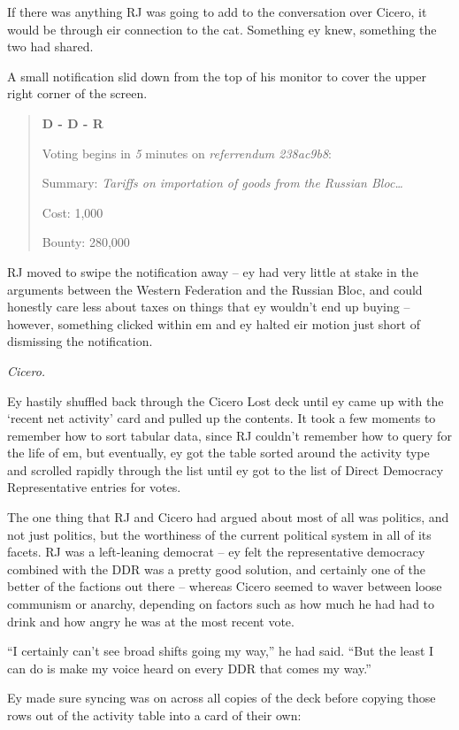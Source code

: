 If there was anything RJ was going to add to the conversation over Cicero, it would be through eir connection to the cat. Something ey knew, something the two had shared.

A small notification slid down from the top of his monitor to cover the upper right corner of the screen.

\begin{quotation}
  \textbf{D - D - R}

  Voting begins in \textit{5} minutes on \textit{referrendum 238ac9b8}:

  Summary: \textit{Tariffs on importation of goods from the Russian Bloc\ldots}

  Cost: 1,000

  Bounty: 280,000
\end{quotation}

RJ moved to swipe the notification away -- ey had very little at stake in the arguments between the Western Federation and the Russian Bloc, and could honestly care less about taxes on things that ey wouldn't end up buying -- however, something clicked within em and ey halted eir motion just short of dismissing the notification.

\textit{Cicero.}

Ey hastily shuffled back through the Cicero Lost deck until ey came up with the `recent net activity' card and pulled up the contents. It took a few moments to remember how to sort tabular data, since RJ couldn't remember how to query for the life of em, but eventually, ey got the table sorted around the activity type and scrolled rapidly through the list until ey got to the list of Direct Democracy Representative entries for votes.

The one thing that RJ and Cicero had argued about most of all was politics, and not just politics, but the worthiness of the current political system in all of its facets. RJ was a left-leaning democrat -- ey felt the representative democracy combined with the DDR was a pretty good solution, and certainly one of the better of the factions out there -- whereas Cicero seemed to waver between loose communism or anarchy, depending on factors such as how much he had had to drink and how angry he was at the most recent vote.

``I certainly can't see broad shifts going my way,'' he had said. ``But the least I can do is make my voice heard on every DDR that comes my way.''

Ey made sure syncing was on across all copies of the deck before copying those rows out of the activity table into a card of their own:

